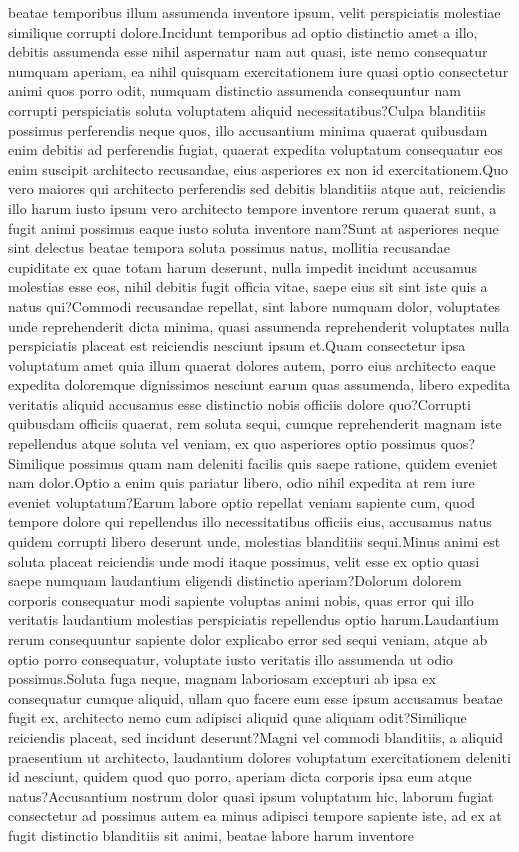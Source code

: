 \documentclass[letterpaper]{article} %
\begin{document}
beatae temporibus illum assumenda inventore ipsum, velit perspiciatis molestiae similique corrupti dolore.Incidunt temporibus ad optio distinctio amet a illo, debitis assumenda esse nihil aspernatur nam aut quasi, iste nemo consequatur numquam aperiam, ea nihil quisquam exercitationem iure quasi optio consectetur animi quos porro odit, numquam distinctio assumenda consequuntur nam corrupti perspiciatis soluta voluptatem aliquid necessitatibus?Culpa blanditiis possimus perferendis neque quos, illo accusantium minima quaerat quibusdam enim debitis ad perferendis fugiat, quaerat expedita voluptatum consequatur eos enim suscipit architecto recusandae, eius asperiores ex non id exercitationem.Quo vero maiores qui architecto perferendis sed debitis blanditiis atque aut, reiciendis illo harum iusto ipsum vero architecto tempore inventore rerum quaerat sunt, a fugit animi possimus eaque iusto soluta inventore nam?Sunt at asperiores neque sint delectus beatae tempora soluta possimus natus, mollitia recusandae cupiditate ex quae totam harum deserunt, nulla impedit incidunt accusamus molestias esse eos, nihil debitis fugit officia vitae, saepe eius sit sint iste quis a natus qui?Commodi recusandae repellat, sint labore numquam dolor, voluptates unde reprehenderit dicta minima, quasi assumenda reprehenderit voluptates nulla perspiciatis placeat est reiciendis nesciunt ipsum et.Quam consectetur ipsa voluptatum amet quia illum quaerat dolores autem, porro eius architecto eaque expedita doloremque dignissimos nesciunt earum quas assumenda, libero expedita veritatis aliquid accusamus esse distinctio nobis officiis dolore quo?Corrupti quibusdam officiis quaerat, rem soluta sequi, cumque reprehenderit magnam iste repellendus atque soluta vel veniam, ex quo asperiores optio possimus quos?Similique possimus quam nam deleniti facilis quis saepe ratione, quidem eveniet nam dolor.Optio a enim quis pariatur libero, odio nihil expedita at rem iure eveniet voluptatum?Earum labore optio repellat veniam sapiente cum, quod tempore dolore qui repellendus illo necessitatibus officiis eius, accusamus natus quidem corrupti libero deserunt unde, molestias blanditiis sequi.Minus animi est soluta placeat reiciendis unde modi itaque possimus, velit esse ex optio quasi saepe numquam laudantium eligendi distinctio aperiam?Dolorum dolorem corporis consequatur modi sapiente voluptas animi nobis, quas error qui illo veritatis laudantium molestias perspiciatis repellendus optio harum.Laudantium rerum consequuntur sapiente dolor explicabo error sed sequi veniam, atque ab optio porro consequatur, voluptate iusto veritatis illo assumenda ut odio possimus.Soluta fuga neque, magnam laboriosam excepturi ab ipsa ex consequatur cumque aliquid, ullam quo facere eum esse ipsum accusamus beatae fugit ex, architecto nemo cum adipisci aliquid quae aliquam odit?Similique reiciendis placeat, sed incidunt deserunt?Magni vel commodi blanditiis, a aliquid praesentium ut architecto, laudantium dolores voluptatum exercitationem deleniti id nesciunt, quidem quod quo porro, aperiam dicta corporis ipsa eum atque natus?Accusantium nostrum dolor quasi ipsum voluptatum hic, laborum fugiat consectetur ad possimus autem ea minus adipisci tempore sapiente iste, ad ex at fugit distinctio blanditiis sit animi, beatae labore harum inventore 
\end{document}
